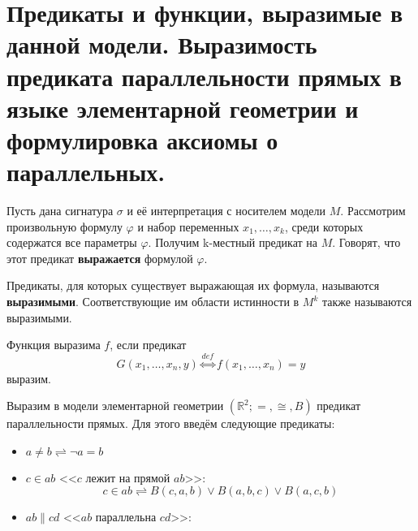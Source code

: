 \section{Предикаты и функции, выразимые в данной модели. Выразимость предиката параллельности прямых в языке
элементарной геометрии и формулировка аксиомы о параллельных.}
\begin{definition}
	Пусть дана сигнатура $\sigma$ и её интерпретация с носителем модели $M$. Рассмотрим произвольную формулу
	$\varphi$ и набор переменных $x_1,\ldots,x_k$, среди которых содержатся все параметры $\varphi$. Получим k-местный
	предикат на $M$. Говорят, что этот предикат \textbf{выражается} формулой $\varphi$.

	Предикаты, для которых существует выражающая их формула, называются \textbf{выразимыми}. Соответствующие им
	области истинности в $M^k$ также называются выразимыми.
\end{definition}
\begin{definition}
	Функция выразима $f$, если предикат $$G(x_1,\ldots,x_n,y) \stackrel{def}{\Longleftrightarrow} f(x_1,\ldots,x_n)
	= y$$ выразим.
\end{definition}
\begin{example}
	Выразим в модели элементарной геометрии $(\mathbb{R}^2;=,\cong,B)$ предикат параллельности прямых. Для этого
	введём следующие предикаты:
	\begin{itemize}
		\item $a \ne b \rightleftharpoons \neg a=b$
		\item $c \in ab$ <<$c$ лежит на прямой $ab$>>: $$c\in ab \rightleftharpoons B(c,a,b)\vee B(a,b,c)\vee
			B(a,c,b)$$
		\item $ab\parallel cd$ <<$ab$ параллельна $cd$>>: 
	\end{itemize}
\end{example}
